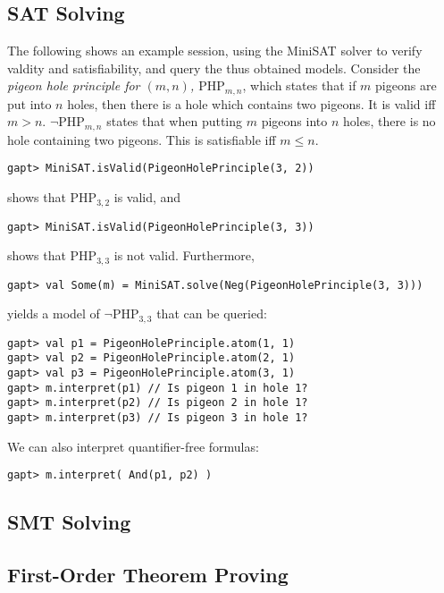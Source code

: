 \documentclass[a4paper,11pt]{article}
\begin{document}
\subsection{SAT Solving}
%
The following shows an example session, using the MiniSAT solver
to verify valdity and satisfiability, and query the thus obtained models.
Consider the {\em pigeon hole principle for $(m, n)$, $\mathrm{PHP}_{m,n}$}, which states that if $m$ pigeons
are put into $n$ holes, then there is a hole which contains two pigeons. It is valid
iff $m>n$. $\neg\mathrm{PHP}_{m,n}$ states that when putting $m$ pigeons into $n$ holes, there
is no hole containing two pigeons. This is satisfiable iff $m\leq n$.
\begin{lstlisting}
gapt> MiniSAT.isValid(PigeonHolePrinciple(3, 2))
\end{lstlisting}
shows that $\mathrm{PHP}_{3,2}$ is valid, and
\begin{lstlisting}
gapt> MiniSAT.isValid(PigeonHolePrinciple(3, 3))
\end{lstlisting}
shows that $\mathrm{PHP}_{3,3}$ is not valid.
Furthermore,
\begin{lstlisting}
gapt> val Some(m) = MiniSAT.solve(Neg(PigeonHolePrinciple(3, 3)))
\end{lstlisting}
yields a model of $\neg\mathrm{PHP}_{3,3}$ that can be queried:
\begin{lstlisting}
gapt> val p1 = PigeonHolePrinciple.atom(1, 1)
gapt> val p2 = PigeonHolePrinciple.atom(2, 1)
gapt> val p3 = PigeonHolePrinciple.atom(3, 1)
gapt> m.interpret(p1) // Is pigeon 1 in hole 1?
gapt> m.interpret(p2) // Is pigeon 2 in hole 1?
gapt> m.interpret(p3) // Is pigeon 3 in hole 1?
\end{lstlisting}
We can also interpret quantifier-free formulas:
\begin{lstlisting}
gapt> m.interpret( And(p1, p2) )
\end{lstlisting}


\subsection{SMT Solving}



\subsection{First-Order Theorem Proving}
\end{document}
